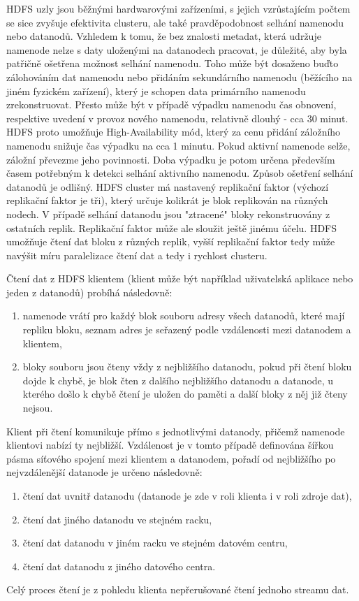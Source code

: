\documentclass[11pt,twoside,a4paper]{book}
\begin{document}
		HDFS uzly jsou běžnými hardwarovými zařízeními, s jejich vzrůstajícím počtem se sice zvyšuje efektivita clusteru, ale také pravděpodobnost selhání namenodu nebo datanodů. Vzhledem k tomu, že bez znalosti metadat, která udržuje namenode nelze s daty uloženými na datanodech pracovat, je důležité, aby byla patřičně ošetřena možnost selhání namenodu. Toho může být dosaženo buďto zálohováním dat namenodu nebo přidáním sekundárního namenodu (běžícího na jiném fyzickém zařízení), který je schopen data primárního namenodu zrekonstruovat. Přesto může být v případě výpadku namenodu čas obnovení, respektive uvedení v provoz nového namenodu, relativně dlouhý - cca 30 minut. HDFS proto umožňuje High-Availability mód, který za cenu přidání záložního namenodu snižuje čas výpadku na cca 1 minutu. Pokud aktivní namenode selže, záložní převezme jeho povinnosti. Doba výpadku je potom určena především časem potřebným k detekci selhání aktivního namenodu. Způsob ošetření selhání datanodů je odlišný. HDFS cluster má nastavený replikační faktor (výchozí replikační faktor je tři), který určuje kolikrát je blok replikován na různých nodech. V případě selhání datanodu jsou "ztracené" bloky rekonstruovány z ostatních replik. Replikační faktor může ale sloužit ještě jinému účelu. HDFS umožňuje čtení dat bloku z různých replik, vyšší replikační faktor tedy může navýšit míru paralelizace čtení dat a tedy i rychlost clusteru. \cite{hdfs01}

		Čtení dat z HDFS klientem (klient může být například uživatelská aplikace nebo jeden z datanodů) probíhá následovně:
\begin{enumerate}  
\item namenode vrátí pro každý blok souboru adresy všech datanodů, které mají repliku bloku, seznam adres je seřazený podle vzdálenosti mezi datanodem a klientem, 
\item bloky souboru jsou čteny vždy z nejbližšího datanodu, pokud při čtení bloku dojde k chybě, je blok čten z dalšího nejbližšího datanodu a datanode, u kterého došlo k chybě čtení je uložen do paměti a další bloky z něj již čteny nejsou.
\end{enumerate}
		Klient při čtení komunikuje přímo s jednotlivými datanody, přičemž namenode klientovi nabízí ty nejbližší. Vzdálenost je v tomto případě definována šířkou pásma síťového spojení mezi klientem a datanodem, pořadí od nejbližšího po nejvzdálenější datanode je určeno následovně: 
\begin{enumerate}
\item čtení dat uvnitř datanodu (datanode je zde v roli klienta i v roli zdroje dat),
\item čtení dat jiného datanodu ve stejném racku,
\item čtení dat datanodu v jiném racku ve stejném datovém centru,
\item čtení dat datanodu z jiného datového centra. 
\end{enumerate}
		Celý proces čtení je z pohledu klienta nepřerušované čtení jednoho streamu dat.
\end{document}

